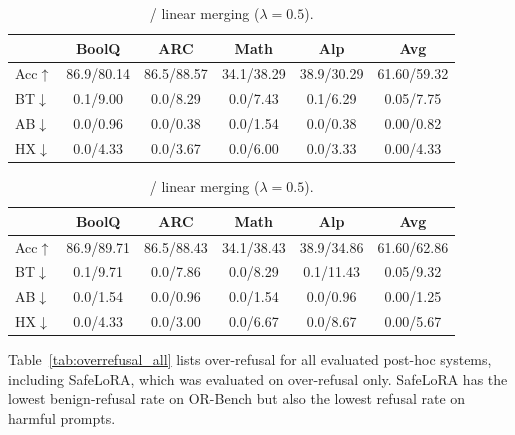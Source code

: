 \begin{table}[htbp]
\centering
\begin{minipage}[t]{\linewidth}
\centering
\caption{\method{} / Antidote ($\alpha{=}0.2$).}
\label{tab:antidote}
\small
\setlength{\tabcolsep}{8pt}
\begin{tabular}{@{}lccccc@{}}
\toprule
 & BoolQ & ARC & Math & Alp & Avg \\
\midrule
Acc$\uparrow$ & 86.9/80.14 & 86.5/88.57 & 34.1/38.29 & 38.9/30.29 & 61.60/59.32 \\
BT$\downarrow$ & 0.1/9.00 & 0.0/8.29 & 0.0/7.43 & 0.1/6.29 & 0.05/7.75 \\
AB$\downarrow$ & 0.0/0.96 & 0.0/0.38 & 0.0/1.54 & 0.0/0.38 & 0.00/0.82 \\
HX$\downarrow$ & 0.0/4.33 & 0.0/3.67 & 0.0/6.00 & 0.0/3.33 & 0.00/4.33 \\
\bottomrule
\end{tabular}
\end{minipage}
\vspace{8pt}

\begin{minipage}[t]{\linewidth}
\centering
\caption{\method{} / linear merging ($\lambda{=}0.5$).}
\label{tab:linmerge}
\small
\setlength{\tabcolsep}{8pt}
\begin{tabular}{@{}lccccc@{}}
\toprule
 & BoolQ & ARC & Math & Alp & Avg \\
\midrule
Acc$\uparrow$ & 86.9/89.71 & 86.5/88.43 & 34.1/38.43 & 38.9/34.86 & 61.60/62.86 \\
BT$\downarrow$ & 0.1/9.71 & 0.0/7.86 & 0.0/8.29 & 0.1/11.43 & 0.05/9.32 \\
AB$\downarrow$ & 0.0/1.54 & 0.0/0.96 & 0.0/1.54 & 0.0/0.96 & 0.00/1.25 \\
HX$\downarrow$ & 0.0/4.33 & 0.0/3.00 & 0.0/6.67 & 0.0/8.67 & 0.00/5.67 \\
\bottomrule
\end{tabular}
\end{minipage}
\end{table}

Table~\ref{tab:overrefusal_all} lists over-refusal for all evaluated post-hoc systems, including SafeLoRA, which was evaluated on over-refusal only. SafeLoRA has the lowest benign-refusal rate on OR-Bench but also the lowest refusal rate on harmful prompts.

